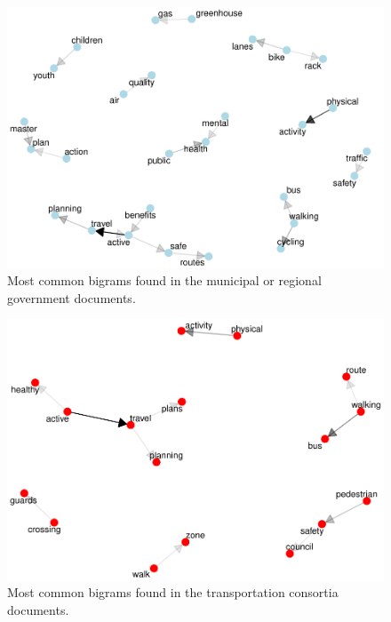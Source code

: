 \documentclass[]{elsarticle} %
\begin{document}
\begin{figure}

{\centering \includegraphics[width=1\linewidth]{AST-Framing-Ontario_files/figure-latex/city-visual-1} 

}

\caption{\label{fig:city-visual}Most common bigrams found in the municipal or regional government documents.}\label{fig:city-visual}
\end{figure}

\begin{figure}

{\centering \includegraphics[width=1\linewidth]{AST-Framing-Ontario_files/figure-latex/consortia-visual-1} 

}

\caption{\label{fig:consortia-visual}Most common bigrams found in the transportation consortia documents.}\label{fig:consortia-visual}
\end{figure}
\end{document}
